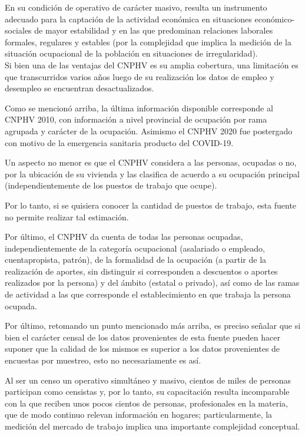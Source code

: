 \documentclass[
  openany]{book}
\begin{document}
En su condición de operativo de carácter masivo, resulta un instrumento adecuado para la captación de la actividad económica en situaciones económico-sociales de mayor estabilidad y en las que predominan relaciones laborales formales, regulares y estables (por la complejidad que implica la medición de la situación ocupacional de la población en situaciones de irregularidad).\\

Si bien una de las ventajas del CNPHV es su amplia cobertura, una limitación es que transcurridos varios años luego de su realización los datos de empleo y desempleo se encuentran desactualizados.

Como se mencionó arriba, la última información disponible corresponde al CNPHV 2010, con información a nivel provincial de ocupación por rama agrupada y carácter de la ocupación.
Asimismo el CNPHV 2020 fue postergado con motivo de la emergencia sanitaria producto del COVID-19.

Un aspecto no menor es que el CNPHV considera a las personas, ocupadas o no, por la ubicación de su vivienda y las clasifica de acuerdo a su ocupación principal (independientemente de los puestos de trabajo que ocupe).

Por lo tanto, si se quisiera conocer la cantidad de puestos de trabajo, esta fuente no permite realizar tal estimación.

Por último, el CNPHV da cuenta de todas las personas ocupadas, independientemente de la categoría ocupacional (asalariado o empleado, cuentapropista, patrón), de la formalidad de la ocupación (a partir de la realización de aportes, sin distinguir si corresponden a descuentos o aportes realizados por la persona) y del ámbito (estatal o privado), así como de las ramas de actividad a las que corresponde el establecimiento en que trabaja la persona ocupada.

Por último, retomando un punto mencionado más arriba, es preciso señalar que si bien el carácter censal de los datos provenientes de esta fuente pueden hacer suponer que la calidad de los mismos es superior a los datos provenientes de encuestas por muestreo, esto no necesariamente es así.

Al ser un censo un operativo simultáneo y masivo, cientos de miles de personas participan como censistas y, por lo tanto, su capacitación resulta incomparable con la que reciben unos pocos cientos de personas, profesionales en la materia, que de modo continuo relevan información en hogares; particularmente, la medición del mercado de trabajo implica una importante complejidad conceptual.
\end{document}
